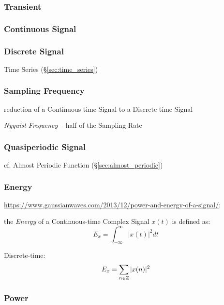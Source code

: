 \subsubsection{Transient}\label{sec:transient}

\subsubsection{Continuous Signal}\label{sec:continuous_signal}

\subsubsection{Discrete Signal}\label{sec:discrete_signal}

\fist Time Series (\S\ref{sec:time_series})



\subsubsection{Sampling Frequency}\label{sec:sampling_frequency}

reduction of a Continuous-time Signal to a Discrete-time Signal

\emph{Nyquist Frequency} -- half of the Sampling Rate



\subsubsection{Quasiperiodic Signal}\label{sec:quasiperiodic_signal}

cf. Almost Periodic Function (\S\ref{sec:almost_periodic})



\subsubsection{Energy}\label{sec:energy}

\url{https://www.gaussianwaves.com/2013/12/power-and-energy-of-a-signal/}:

the \emph{Energy} of a Continuous-time Complex Signal $x(t)$ is defined as:
\[
  E_x = \int_{-\infty}^\infty |x(t)|^2 dt
\]

Discrete-time:
\[
  E_x = \sum_{n \in \mathbb{Z}} |x(n)|^2
\]



\subsubsection{Power}\label{sec:signal_power}

